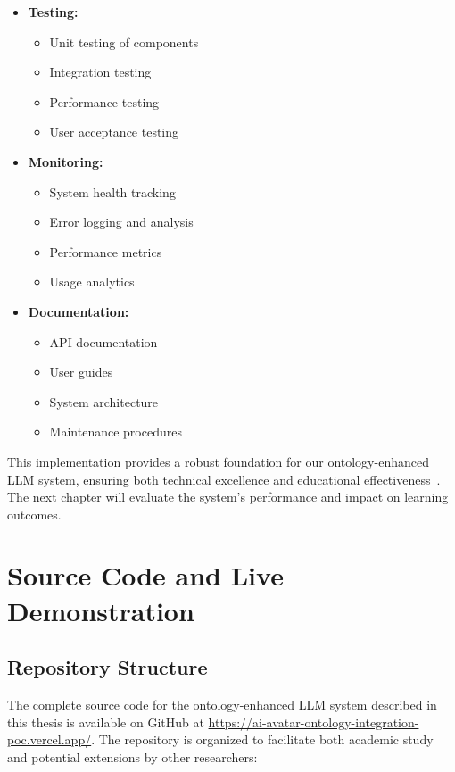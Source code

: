 \begin{itemize}
  \item \textbf{Testing:}
    \begin{itemize}
      \item Unit testing of components
      \item Integration testing
      \item Performance testing
      \item User acceptance testing
    \end{itemize}
  
  \item \textbf{Monitoring:}
    \begin{itemize}
      \item System health tracking
      \item Error logging and analysis
      \item Performance metrics
      \item Usage analytics
    \end{itemize}
  
  \item \textbf{Documentation:}
    \begin{itemize}
      \item API documentation
      \item User guides
      \item System architecture
      \item Maintenance procedures
    \end{itemize}
\end{itemize}

This implementation provides a robust foundation for our ontology-enhanced LLM system, ensuring both technical excellence and educational effectiveness~\cite{scibite2024ontologies, horrocks2024owl}. The next chapter will evaluate the system's performance and impact on learning outcomes. 


\section{Source Code and Live Demonstration}
\label{sec:code-demo}

\subsection{Repository Structure}
\label{subsec:repo-structure}

The complete source code for the ontology-enhanced LLM system described in this thesis is available on GitHub at \url{https://ai-avatar-ontology-integration-poc.vercel.app/}. The repository is organized to facilitate both academic study and potential extensions by other researchers:

